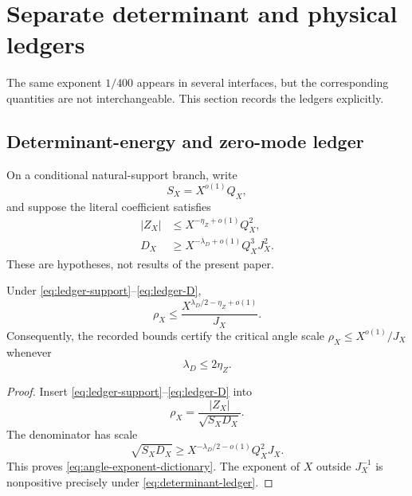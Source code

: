 \section{Separate determinant and physical ledgers}
\label{sec:separate-ledgers}

The same exponent \(1/400\) appears in several interfaces, but the
corresponding quantities are not interchangeable.  This section
records the ledgers explicitly.

\subsection{Determinant-energy and zero-mode ledger}

On a conditional natural-support branch, write
\begin{equation}
 S_X=X^{o(1)}Q_X,
\label{eq:ledger-support}
\end{equation}
and suppose the literal coefficient satisfies
\begin{align}
 |Z_X|
 &\le
 X^{-\eta_Z+o(1)}Q_X^2,
\label{eq:ledger-Z}\\
 D_X
 &\ge
 X^{-\lambda_D+o(1)}Q_X^3J_X^2.
\label{eq:ledger-D}
\end{align}
These are hypotheses, not results of the present paper.

\begin{proposition}
\label{prop:angle-exponent-dictionary}
Under
\eqref{eq:ledger-support}--\eqref{eq:ledger-D},
\begin{equation}
 \rho_X
 \le
 \frac{
 X^{\lambda_D/2-\eta_Z+o(1)}
 }{J_X}.
\label{eq:angle-exponent-dictionary}
\end{equation}
Consequently, the recorded bounds certify the critical angle scale
\(\rho_X\le X^{o(1)}/J_X\) whenever
\begin{equation}
 \boxed{\lambda_D\le2\eta_Z.}
\label{eq:determinant-ledger}
\end{equation}
\end{proposition}

\begin{proof}
Insert \eqref{eq:ledger-support}--\eqref{eq:ledger-D} into
\[
 \rho_X=\frac{|Z_X|}{\sqrt{S_XD_X}}.
\]
The denominator has scale
\[
 \sqrt{S_XD_X}
 \ge
 X^{-\lambda_D/2-o(1)}Q_X^2J_X.
\]
This proves \eqref{eq:angle-exponent-dictionary}.  The exponent of
\(X\) outside \(J_X^{-1}\) is nonpositive precisely under
\eqref{eq:determinant-ledger}.
\end{proof}

